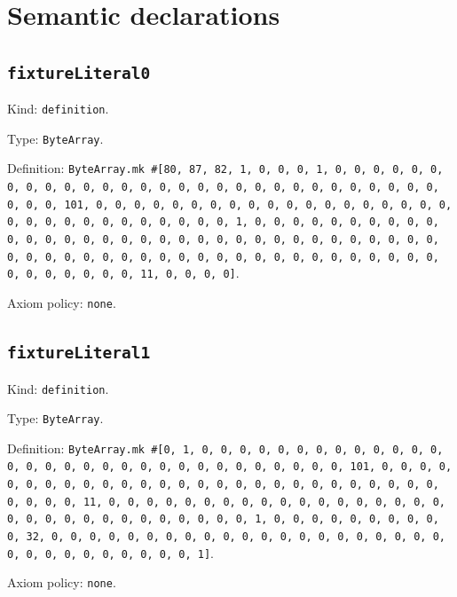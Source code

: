 \documentclass[11pt]{article}
\begin{document}
\section*{Semantic declarations}
\subsection*{\texttt{fixtureLiteral0}}
\noindent Kind: \texttt{definition}.\par
\noindent Type: \texttt{ByteArray}.\par
\noindent Definition: \texttt{ByteArray.mk \#[80, 87, 82, 1, 0, 0, 0, 1, 0, 0, 0, 0, 0, 0, 0, 0, 0, 0, 0, 0, 0, 0, 0, 0, 0, 0, 0, 0, 0, 0, 0, 0, 0, 0, 0, 0, 0, 0, 0, 0, 101, 0, 0, 0, 0, 0, 0, 0, 0, 0, 0, 0, 0, 0, 0, 0, 0, 0, 0, 0, 0, 0, 0, 0, 0, 0, 0, 0, 0, 0, 0, 0, 1, 0, 0, 0, 0, 0, 0, 0, 0, 0, 0, 0, 0, 0, 0, 0, 0, 0, 0, 0, 0, 0, 0, 0, 0, 0, 0, 0, 0, 0, 0, 0, 0, 0, 0, 0, 0, 0, 0, 0, 0, 0, 0, 0, 0, 0, 0, 0, 0, 0, 0, 0, 0, 0, 0, 0, 0, 0, 0, 0, 0, 0, 0, 0, 11, 0, 0, 0, 0]}.\par
\noindent Axiom policy: \texttt{none}.\par
\subsection*{\texttt{fixtureLiteral1}}
\noindent Kind: \texttt{definition}.\par
\noindent Type: \texttt{ByteArray}.\par
\noindent Definition: \texttt{ByteArray.mk \#[0, 1, 0, 0, 0, 0, 0, 0, 0, 0, 0, 0, 0, 0, 0, 0, 0, 0, 0, 0, 0, 0, 0, 0, 0, 0, 0, 0, 0, 0, 0, 0, 0, 101, 0, 0, 0, 0, 0, 0, 0, 0, 0, 0, 0, 0, 0, 0, 0, 0, 0, 0, 0, 0, 0, 0, 0, 0, 0, 0, 0, 0, 0, 0, 0, 11, 0, 0, 0, 0, 0, 0, 0, 0, 0, 0, 0, 0, 0, 0, 0, 0, 0, 0, 0, 0, 0, 0, 0, 0, 0, 0, 0, 0, 0, 0, 0, 1, 0, 0, 0, 0, 0, 0, 0, 0, 0, 0, 32, 0, 0, 0, 0, 0, 0, 0, 0, 0, 0, 0, 0, 0, 0, 0, 0, 0, 0, 0, 0, 0, 0, 0, 0, 0, 0, 0, 0, 0, 0, 0, 1]}.\par
\noindent Axiom policy: \texttt{none}.\par
\end{document}
